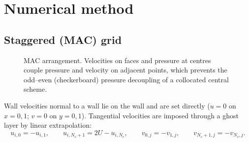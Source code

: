 \section{Numerical method}
\subsection{Staggered (MAC) grid}
\begin{figure}[H]\centering
{}
\caption{MAC arrangement. Velocities on faces and pressure at centres couple pressure and velocity on adjacent points, which prevents the odd--even (checkerboard) pressure decoupling of a collocated central scheme.}\end{figure}
Wall velocities normal to a wall lie on the wall and are set directly ($u=0$ on $x=0,1$; $v=0$ on $y=0,1$). Tangential velocities are imposed through a ghost layer by linear extrapolation:
\begin{equation}u_{i,0}=-u_{i,1},\qquad u_{i,N_c+1}=2U-u_{i,N_c},\qquad v_{0,j}=-v_{1,j},\qquad v_{N_c+1,j}=-v_{N_c,j}.\end{equation}

